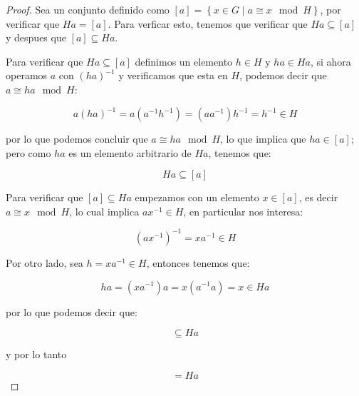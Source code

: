         \begin{proof}
            Sea un conjunto definido como $[a] = \left\{ x \in G \mid a \cong x \mod H \right\}$, por verificar que $Ha = [a]$. Para verficar esto, tenemos que verificar que $Ha \subseteq [a]$ y despues que $[a] \subseteq Ha$.

            Para verificar que $Ha \subseteq [a]$ definimos un elemento $h \in H$ y $ha \in Ha$, si ahora operamos $a$ con $(ha)^{-1}$ y verificamos que esta en $H$, podemos decir que $a \cong ha \mod H$:

            \begin{equation*}
                a(ha)^{-1} = a(a^{-1}h^{-1}) = (a a^{-1})h^{-1} = h^{-1} \in H
            \end{equation*}

            por lo que podemos concluir que $a \cong ha \mod H$, lo que implica que $ha \in [a]$; pero como $ha$ es un elemento arbitrario de $Ha$, tenemos que:

            \begin{equation*}
                Ha \subseteq [a]
            \end{equation*}

            Para verificar que $[a] \subseteq Ha$ empezamos con un elemento $x \in [a]$, es decir $a \cong x \mod H$, lo cual implica $a x^{-1} \in H$, en particular nos interesa:

            \begin{equation*}
                (a x^{-1})^{-1} = x a^{-1} \in H
            \end{equation*}

            Por otro lado, sea $h = x a^{-1} \in H$, entonces tenemos que:

            \begin{equation*}
                ha = (x a^{-1})a = x (a^{-1} a) = x \in Ha
            \end{equation*}

            por lo que podemos decir que:

            \begin{equation*}
                [a] \subseteq Ha
            \end{equation*}

            y por lo tanto

            \begin{equation*}
                [a] = Ha
            \end{equation*}
        \end{proof}

